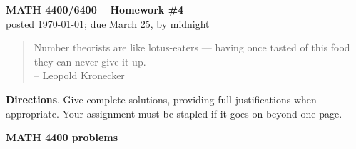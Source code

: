 \documentclass[12pt]{article}
\begin{document}
\thispagestyle{empty} \begin{center} {\textbf{MATH 4400/6400 --
Homework \#4}\\ posted \today; due March 25, by midnight}
\end{center}

{\scriptsize \begin{quote} Number theorists are like lotus-eaters --- having once tasted of this food they can never give it up.\\
    -- Leopold Kronecker\end{quote}}

 
\vskip 10pt \noindent\textbf{Directions}. Give complete solutions, providing full justifications when appropriate. Your assignment must be stapled if it goes on beyond one page.

\vskip 10pt \noindent\textbf{MATH 4400 problems}
\end{document}
